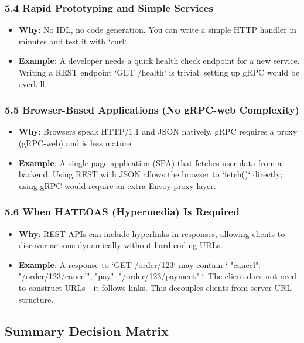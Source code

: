 \documentclass[a4paper]{article}
\begin{document}
\subsubsection{5.4 Rapid Prototyping and Simple Services}
\begin{itemize}
    \item \textbf{Why}: No IDL, no code generation. You can write a simple HTTP handler in minutes and test it with `curl`.
    \item \textbf{Example}: A developer needs a quick health check endpoint for a new service. Writing a REST endpoint `GET /health` is trivial; setting up gRPC would be overkill.
\end{itemize}

\subsubsection{5.5 Browser-Based Applications (No gRPC-web Complexity)}
\begin{itemize}
    \item \textbf{Why}: Browsers speak HTTP/1.1 and JSON natively. gRPC requires a proxy (gRPC-web) and is less mature.
    \item \textbf{Example}: A single-page application (SPA) that fetches user data from a backend. Using REST with JSON allows the browser to `fetch()` directly; using gRPC would require an extra Envoy proxy layer.
\end{itemize}

\subsubsection{5.6 When HATEOAS (Hypermedia) Is Required}
\begin{itemize}
    \item \textbf{Why}: REST APIs can include hyperlinks in responses, allowing clients to discover actions dynamically without hard-coding URLs.
    \item \textbf{Example}: A response to `GET /order/123` may contain `{ "cancel": "/order/123/cancel", "pay": "/order/123/payment" }`. The client does not need to construct URLs - it follows links. This decouples clients from server URL structure.
\end{itemize}

\subsection{Summary Decision Matrix}
\end{document}

